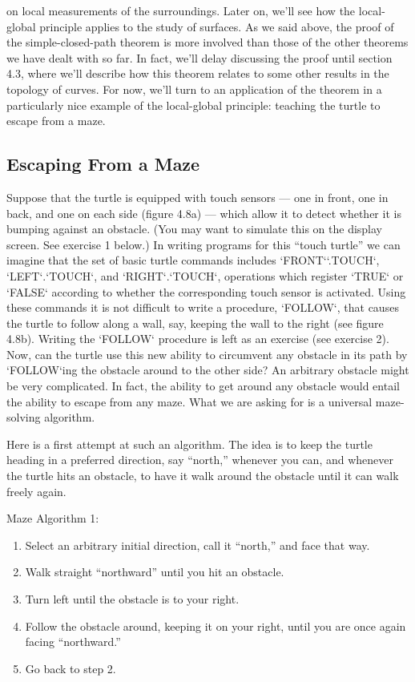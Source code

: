 \documentclass{book}
\begin{document}
on local measurements of the surroundings. Later on, we'll see how the
local-global principle applies to the study of surfaces.
As we said above, the proof of the simple-closed-path theorem is more
involved than those of the other theorems we have dealt with so far.
In fact, we'll delay discussing the proof until section 4.3, where we'll
describe how this theorem relates to some other results in the topology
of curves. For now, we'll turn to an application of the theorem in a
particularly nice example of the local-global principle: teaching the turtle
to escape from a maze.

\subsection{Escaping From a Maze}

Suppose that the turtle is equipped with touch sensors --- one in front,
one in back, and one on each side (figure 4.8a) --- which allow it to detect
whether it is bumping against an obstacle. (You may want to simulate
this on the display screen. See exercise 1 below.) In writing programs for
this ``touch turtle'' we can imagine that the set of basic turtle commands
includes \textsc{`FRONT`}\textsc{`.TOUCH`}, \textsc{`LEFT`}.\textsc{`TOUCH`}, and \textsc{`RIGHT`}.\textsc{`TOUCH`}, operations which
register \textsc{`TRUE`} or \textsc{`FALSE`} according to whether the corresponding touch
sensor is activated. Using these commands it is not difficult to write a
procedure, \textsc{`FOLLOW`}, that causes the turtle to follow along a wall, say,
keeping the wall to the right (see figure 4.8b). Writing the \textsc{`FOLLOW`}
procedure is left as an exercise (see exercise 2).
Now, can the turtle use this new ability to circumvent any obstacle
in its path by \textsc{`FOLLOW`}ing the obstacle around to the other side? An
arbitrary obstacle might be very complicated. In fact, the ability to get
around any obstacle would entail the ability to escape from any maze.
What we are asking for is a universal maze-solving algorithm.

Here is a first attempt at such an algorithm. The idea is to keep the
turtle heading in a preferred direction, say ``north,'' whenever you can,
and whenever the turtle hits an obstacle, to have it walk around the
obstacle until it can walk freely again.

Maze Algorithm 1:
\begin{enumerate}
\item Select an arbitrary initial direction, call it ``north,'' and face that
way.
\item Walk straight ``northward'' until you hit an obstacle.
\item Turn left until the obstacle is to your right.
\item Follow the obstacle around, keeping it on your right, until you are
once again facing ``northward.''
\item Go back to step 2.
\end{enumerate}
\end{document}
